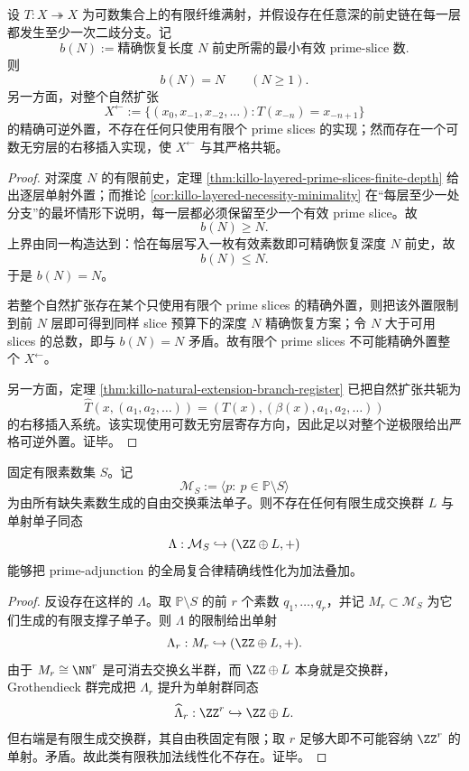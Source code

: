 \begin{theorem}[有限深度与逆极限之间的严格预算相变]\label{thm:conclusion-prime-adjunction-finite-depth-inverse-limit-budget-phase}
设 \(T:X\twoheadrightarrow X\) 为可数集合上的有限纤维满射，并假设存在任意深的前史链在每一层都发生至少一次二歧分支。记
\[
b(N):=\text{精确恢复长度 }N\text{ 前史所需的最小有效 prime-slice 数}.
\]
则
\[
b(N)=N
\qquad (N\ge 1).
\]
另一方面，对整个自然扩张
\[
X^{\leftarrow}
:=
\{(x_0,x_{-1},x_{-2},\dots):T(x_{-n})=x_{-n+1}\}
\]
的精确可逆外置，不存在任何只使用有限个 prime slices 的实现；然而存在一个可数无穷层的右移插入实现，使 \(X^{\leftarrow}\) 与其严格共轭。
\end{theorem}
\begin{proof}
对深度 \(N\) 的有限前史，定理 \ref{thm:killo-layered-prime-slices-finite-depth} 给出逐层单射外置；而推论 \ref{cor:killo-layered-necessity-minimality} 在“每层至少一处分支”的最坏情形下说明，每一层都必须保留至少一个有效 prime slice。故
\[
b(N)\ge N.
\]
上界由同一构造达到：恰在每层写入一枚有效素数即可精确恢复深度 \(N\) 前史，故
\[
b(N)\le N.
\]
于是 \(b(N)=N\)。

若整个自然扩张存在某个只使用有限个 prime slices 的精确外置，则把该外置限制到前 \(N\) 层即可得到同样 slice 预算下的深度 \(N\) 精确恢复方案；令 \(N\) 大于可用 slices 的总数，即与 \(b(N)=N\) 矛盾。故有限个 prime slices 不可能精确外置整个 \(X^{\leftarrow}\)。

另一方面，定理 \ref{thm:killo-natural-extension-branch-register} 已把自然扩张共轭为
\[
\widehat T(x,(a_1,a_2,\dots))=(T(x),(\beta(x),a_1,a_2,\dots))
\]
的右移插入系统。该实现使用可数无穷层寄存方向，因此足以对整个逆极限给出严格可逆外置。证毕。
\end{proof}

\begin{proposition}\label{prop:conclusion-prime-adjunction-no-finite-rank-additive-linearization}
固定有限素数集 \(S\)。记
\[
\mathcal M_S:=\langle p:\ p\in\mathbb P\setminus S\rangle
\]
为由所有缺失素数生成的自由交换乘法单子。则不存在任何有限生成交换群 \(L\) 与单射单子同态
\[
\Lambda:\mathcal M_S\hookrightarrow (\ZZ\oplus L,+)
\]
能够把 prime-adjunction 的全局复合律精确线性化为加法叠加。
\end{proposition}
\begin{proof}
反设存在这样的 \(\Lambda\)。取 \(\mathbb P\setminus S\) 的前 \(r\) 个素数 \(q_1,\dots,q_r\)，并记 \(M_r\subset \mathcal M_S\) 为它们生成的有限支撑子单子。则 \(\Lambda\) 的限制给出单射
\[
\Lambda_r:M_r\hookrightarrow (\ZZ\oplus L,+).
\]
由于 \(M_r\cong \NN^r\) 是可消去交换幺半群，而 \(\ZZ\oplus L\) 本身就是交换群，Grothendieck 群完成把 \(\Lambda_r\) 提升为单射群同态
\[
\widehat\Lambda_r:\ZZ^r\hookrightarrow \ZZ\oplus L.
\]
但右端是有限生成交换群，其自由秩固定有限；取 \(r\) 足够大即不可能容纳 \(\ZZ^r\) 的单射。矛盾。故此类有限秩加法线性化不存在。证毕。
\end{proof}
